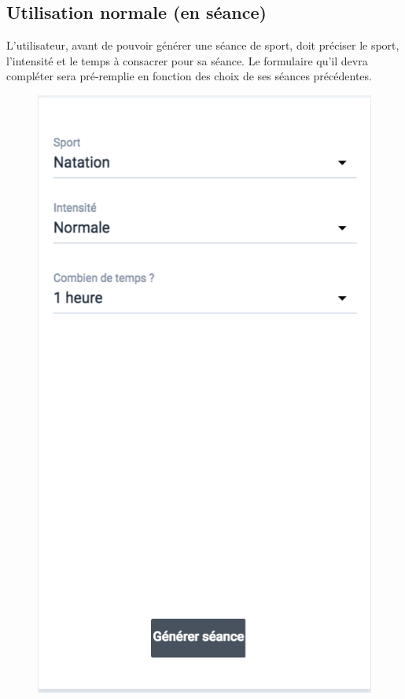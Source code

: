 \subsection*{Utilisation normale (en séance)}
L'utilisateur, avant de pouvoir générer une séance de sport, doit préciser le sport, l'intensité et le temps à consacrer pour sa séance. Le formulaire qu'il devra compléter sera pré-remplie en fonction des choix de ses séances précédentes.   

\begin{figure}[!h]
\includegraphics[scale=0.3]{ihms/seance}

\end{figure}
